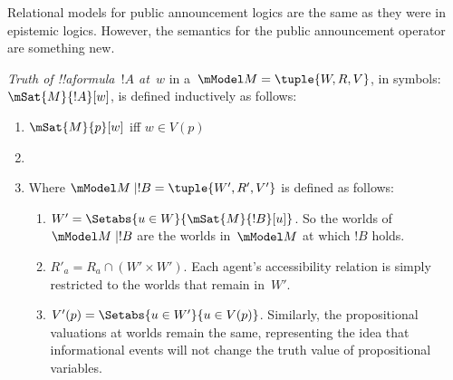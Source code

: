 \documentclass[../../../include/open-logic-section]{subfiles}
\begin{document}


Relational models for public announcement logics are the same as they
were in epistemic logics. However, the semantics for the public
announcement operator are something new.

\begin{defn} \emph{Truth of !!a{formula}~$!A$
  at~$w$} in a~$\mModel M = \tuple{W, R, V}$, in symbols:
  $\mSat{M}{!A}[w]$, is defined inductively as follows:
  \begin{enumerate}
  \item $\mSat{M}{p}[w]$ iff $w \in V(p)$
  \item{}
  \item{}

  
  Where $\mModel M \mid !B = \tuple{W', R', V'}$ is defined as
  follows:
  \begin{enumerate}
    \item $W' = \Setabs{ u \in W}{\mSat{M}{!B}[u]}$. So the worlds of
      $\mModel M \mid !B$ are the worlds in~$\mModel M$ at which $!B$
      holds.
    \item $R'_a = R_a \cap (W' \times W')$. Each agent's accessibility
      relation is simply restricted to the worlds that remain in~$W'$.
    \item $V'(p) = \Setabs{ u \in W'}{u \in V(p) }$. Similarly, the
      propositional valuations at worlds remain the same, representing
      the idea that informational events will not change the truth
      value of propositional variables.
  \end{enumerate}
  
  \end{enumerate} 
\end{defn}
\end{document}
